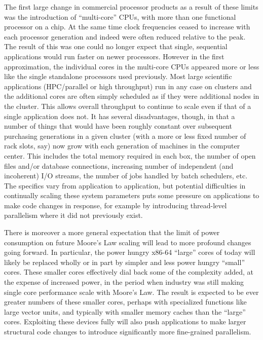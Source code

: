 The first large change in commercial processor products as a
result of these limits was the introduction of ``multi-core'' CPUs,
with more than one functional processor on a chip. At the same time
clock frequencies ceased to increase with each processor generation and
indeed were often reduced relative to the peak. The result of this was
one could no longer expect that single, sequential applications would
run faster on newer processors. However in the first approximation,
the individual cores in the multi-core CPUs appeared more or less
like the single standalone processors used previously. Most large
scientific applications (HPC/parallel or high throughput) run in
any case on clusters and the additional cores are often simply
scheduled as if they were additional nodes in the cluster. This
allows overall throughput to continue to scale even if that of a
single application does not. It has several disadvantages, though,
in that a number of things that would have been roughly constant
over subsequent purchasing generations in a given cluster (with
a more or less fixed number of rack slots, say) now grow with each
generation of machines in the computer center. This includes the
total memory required in each box, the number of open files and/or
database connections, increasing number of independent (and incoherent)
I/O streams, the number of jobs handled by batch schedulers,
etc.  The specifics vary from application to application, but
potential difficulties in continually scaling these system parameters
puts some pressure on applications to make code changes in response,
for example by introducing thread-level parallelism where it did
not previously exist.

There is moreover a more general expectation that the limit of power
consumption on future Moore's Law scaling will lead to more profound
changes going forward. In particular, the power hungry x86-64
``large'' cores of today will likely be replaced wholly or in part by
simpler and less power hungry ``small'' cores. These smaller cores
effectively dial back some of the complexity added, at the expense of
increased power, in the period when industry was still making single
core performance scale with Moore's Law.  The result is expected to be
ever greater numbers of these smaller cores, perhaps with specialized
functions like large vector units, and typically with smaller memory
caches than the ``large'' cores.  Exploiting these devices fully will
also push applications to make larger structural code changes to
introduce significantly more fine-grained parallelism.

